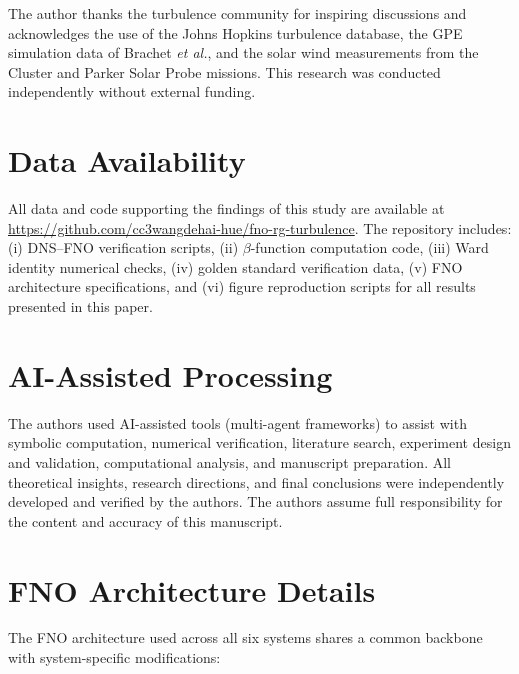 \begin{acknowledgments}
The author thanks the turbulence community for inspiring discussions and acknowledges the use of the Johns Hopkins turbulence database, the GPE simulation data of Brachet \textit{et al.}, and the solar wind measurements from the Cluster and Parker Solar Probe missions. This research was conducted independently without external funding.
\end{acknowledgments}

\section*{Data Availability}
All data and code supporting the findings of this study are available at \url{https://github.com/cc3wangdehai-hue/fno-rg-turbulence}. The repository includes: (i) DNS--FNO verification scripts, (ii) $\beta$-function computation code, (iii) Ward identity numerical checks, (iv) golden standard verification data, (v) FNO architecture specifications, and (vi) figure reproduction scripts for all results presented in this paper.

\section*{AI-Assisted Processing}
The authors used AI-assisted tools (multi-agent frameworks) to assist with symbolic computation, numerical verification, literature search, experiment design and validation, computational analysis, and manuscript preparation. All theoretical insights, research directions, and final conclusions were independently developed and verified by the authors. The authors assume full responsibility for the content and accuracy of this manuscript.

\appendix

\section{FNO Architecture Details\label{app:fno}}

The FNO architecture used across all six systems shares a common backbone with system-specific modifications:

